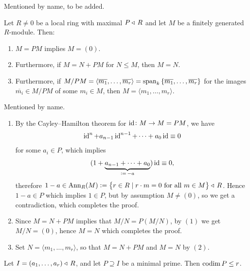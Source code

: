 \documentclass[11pt,a4paper]{article}
\begin{document}
\begin{definition}
  Mentioned by name, to be added.
\end{definition}

\begin{lemma}
  \label{lem:nakayama}
  Let $R \neq 0$ be a local ring with maximal $P \triangleleft\, R$
  and let $M$ be a finitely generated $R$-module. 
  Then:
  \begin{enumerate}
    \item[(1)] $M = PM$ implies $M = (0)$.
    \item[(2)] Furthermore, if $M = N + PM$ for $N \leqslant M$,
      then $M = N$.
    \item[(3)] Furthermore,
      if $M/PM = \langle \overline{m_1},\dots,\overline{m_r} \rangle
      = \operatorname{span}_k\left\{\overline{m_1},\dots,\overline{m_r}\right\}$ 
      for the images $\overline{m_i} \in M/PM$ of some $m_i \in M$,
      then $M = \langle m_1,\dots,m_r\rangle$.
  \end{enumerate}
\end{lemma}

\begin{theorem}
  Mentioned by name.
\end{theorem}

\begin{proofof}{} \phantom{}
  \begin{enumerate}
    \item[(1)] By the Cayley--Hamilton theorem for $\operatorname{id} \colon M \to M = PM$,
      we have
      \[
        \operatorname{id}^n + a_{n-1} \operatorname{id}^{n-1} + \cdots + a_0 \operatorname{id} \equiv 0
      \]
      for some $a_i \in P$, which implies
      \[
        (1 + \underbrace{a_{n-1} + \cdots + a_0}_{:=\,-a}) \operatorname{id} \equiv 0,
      \]
      therefore $1 - a \in \operatorname{Ann}_R(M) := \left\{r \in R \mid r \cdot m = 0 \text{ for all } m \in M\right\} \triangleleft\, R$.
      Hence $1 - a \in P$ which implies $1 \in P$,
      but by assumption $M \neq (0)$,
      so we get a contradiction, which completes the proof.
    \item[(2)] Since $M = N + PM$ implies that $M/N = P(M/N)$,
      by $(1)$ we get $M/N = (0)$, hence $M = N$ which completes the proof.
    \item[(3)] Set $N = \langle m_1,\dots,m_r \rangle$, 
      so that $M = N + PM$ and $M = N$ by $(2)$.
  \end{enumerate}
\end{proofof}

\begin{theorem}
  Let $I =  (a_1,\dots,a_r) \triangleleft\, R$,
  and let $P \supseteq I$ be a minimal prime.
  Then $\operatorname{codim} P \le r$.
\end{theorem}
\end{document}
